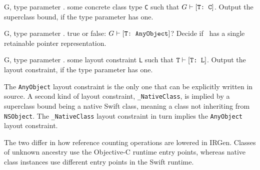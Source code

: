 \documentclass[../generics]{subfiles}
\begin{document}
\begin{itemize}
{G, \tT}
{type parameter \tT.}
{some concrete class type \texttt{C} such that $G\vdash[\texttt{T:~C}]$.}
{Output the superclass bound, if the type parameter has one.}

{G, \tT}
{type parameter \tT.}
{true or false: $G\vdash[\texttt{T:~AnyObject}]$?}
{Decide if \tT\ has a single retainable pointer representation.}

{G, \tT}
{type parameter \tT.}
{some layout constraint \texttt{L} such that $\texttt{T}\vdash[\texttt{T:~L}]$.}
{Output the layout constraint, if the type parameter has one.}

The \texttt{AnyObject} layout constraint is the only one that can be explicitly written in source. A second kind of layout constraint, \verb|_NativeClass|, is implied by a superclass bound being a native Swift class, meaning a class not inheriting from \texttt{NSObject}. The \verb|_NativeClass| layout constraint in turn implies the \texttt{AnyObject} layout constraint.

The two differ in how reference counting operations are lowered in IRGen. Classes of unknown ancestry use the Objective-C runtime entry points, whereas native class instances use different entry points in the Swift runtime.
\end{itemize}
\end{document}
